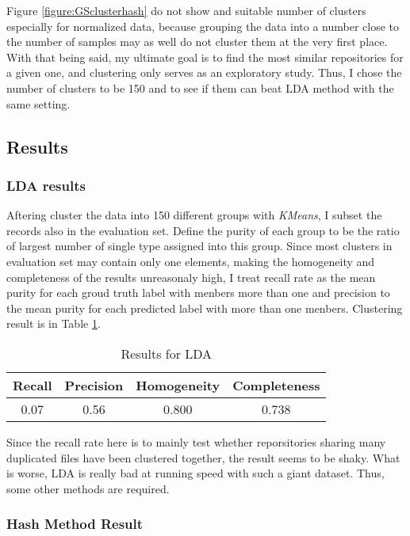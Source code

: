 Figure \ref{figure:GSclusterhash} do not show and suitable number of
clusters especially for normalized data, because grouping the data into
a number close to the number of samples may as well do not cluster them
at the very first place. With that being said, my ultimate goal is to
find the most similar repositories for a given one, and clustering only
serves as an exploratory study. Thus, I chose the number of clusters to
be 150 and to see if them can beat LDA method with the same setting.

\hypertarget{results}{%
\subsection{Results}\label{results}}

\hypertarget{lda-results}{%
\subsubsection{LDA results}\label{lda-results}}

Aftering cluster the data into 150 different groups with \emph{KMeans},
I subset the records also in the evaluation set. Define the purity of
each group to be the ratio of largest number of single type assigned
into this group. Since most clusters in evaluation set may contain only
one elements, making the homogeneity and completeness of the results
unreasonaly high, I treat recall rate as the mean purity for each groud
truth label with menbers more than one and precision to the mean purity
for each predicted label with more than one menbers. Clustering result
is in Table \ref{table:ldares}.

\begin{table}[h]
\centering
\begin{tabular}{c|c|c|c}
\toprule
Recall & Precision & Homogeneity & Completeness \\
\midrule
0.07 & 0.56 & 0.800 & 0.738 \\
\bottomrule
\end{tabular}
\caption{Results for LDA}
\label{table:ldares}
\end{table}

Since the recall rate here is to mainly test whether reporsitories
sharing many duplicated files have been clustered together, the result
seems to be shaky. What is worse, LDA is really bad at running speed
with such a giant dataset. Thus, some other methods are required.

\hypertarget{hash-method-result}{%
\subsubsection{Hash Method Result}\label{hash-method-result}}

